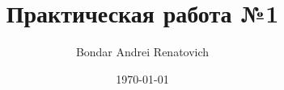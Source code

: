 \documentclass[14pt,a4paper,oneside]{extarticle}
\author{Bondar Andrei Renatovich}
\title{Практическая работа №1}
\date{\today}
\begin{document}
\renewcommand{\figurename}{Рисунок}



\tableofcontents


\end{document}

